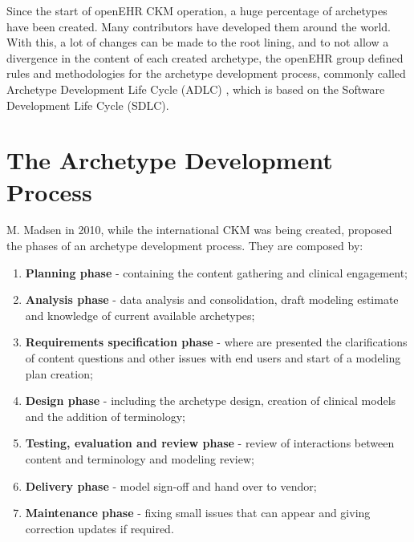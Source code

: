 \documentclass[mim_thesis.tex]{subfiles}
\begin{document}
Since the start of openEHR CKM operation, a huge percentage of archetypes have been created. Many contributors have developed them around the world. With this, a lot of changes can be made to the root lining, and to not allow a divergence in the content of each created archetype, the openEHR group defined rules and methodologies for the archetype development process, commonly called Archetype Development Life Cycle (ADLC) \citep{Madsen2010}, which is based on the Software Development Life Cycle (SDLC).


\section{The Archetype Development Process}

M. Madsen in 2010, while the international CKM was being created, proposed the phases of an archetype development process. They are composed by:

\begin{enumerate}[noitemsep]
\item \textbf{Planning phase} - containing the content gathering and clinical engagement;
\item \textbf{Analysis phase} - data analysis and consolidation, draft modeling estimate and knowledge of current available archetypes;
\item \textbf{Requirements specification phase} - where are presented the clarifications of content questions and other issues with end users and start of a modeling plan creation;
\item \textbf{Design phase} - including the archetype design, creation of clinical models and the addition of terminology;
\item \textbf{Testing, evaluation and review phase} - review of interactions between content and terminology and modeling review;
\item \textbf{Delivery phase} - model sign-off and hand over to vendor;
\item \textbf{Maintenance phase} - fixing small issues that can appear and giving correction updates if required.
\end{enumerate}
\end{document}
